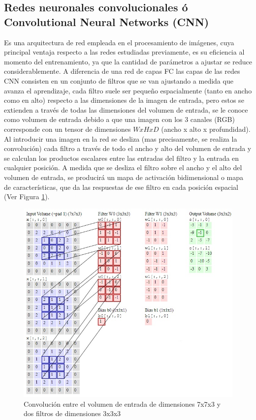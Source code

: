 \subsection{Redes neuronales convolucionales ó Convolutional Neural Networks (CNN)}
Es una arquitectura de red empleada en el procesamiento de imágenes, cuya principal ventaja respecto a las redes estudiadas previamente, es su eficiencia al momento del entrenamiento, ya que la cantidad de parámetros a ajustar se reduce considerablemente. A diferencia de una red de capas FC las capas de las redes CNN consisten en un conjunto de filtros que se van ajustando a medida que avanza el aprendizaje, cada filtro suele ser pequeño espacialmente (tanto en ancho como en alto)  respecto a las dimensiones de la imagen de entrada, pero estos se extienden a través de todas las dimensiones del volumen de entrada, se le conoce como volumen de entrada debido a que una imagen con los 3 canales (RGB) corresponde con un tensor de dimensiones  $WxHxD$ (ancho x alto x profundidad). Al introducir una imagen en la red se desliza (mas precisamente, se realiza la convolución) cada filtro a través de todo el ancho y alto del volumen de entrada y se calculan los productos escalares entre las entradas del filtro y la entrada en cualquier posición.  A medida que se desliza el filtro sobre el ancho y el alto del volumen de entrada, se producirá un mapa de activación bidimensional o mapa de características, que da las respuestas de ese filtro en cada posición espacial (Ver Figura \ref{fowardPassCNN}).
\begin{figure}[H]
    \centering
    \includegraphics[scale=0.7]{Recursos/fowardPassCNN.jpg}
    \caption{Convolución entre el volumen de entrada de dimensiones 7x7x3 y dos filtros de dimensiones 3x3x3}
    \label{fowardPassCNN}
\end{figure}
